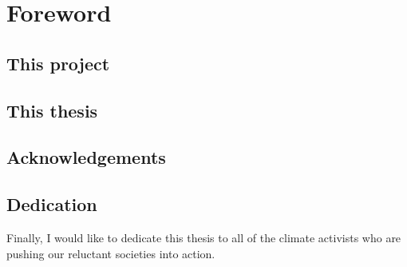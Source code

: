 \section*{Foreword}

\subsection*{This project}


\subsection*{This thesis}


\subsection*{Acknowledgements}



\subsection*{Dedication}

Finally, I would like to dedicate this thesis to all of the climate activists who are pushing our reluctant societies into action.